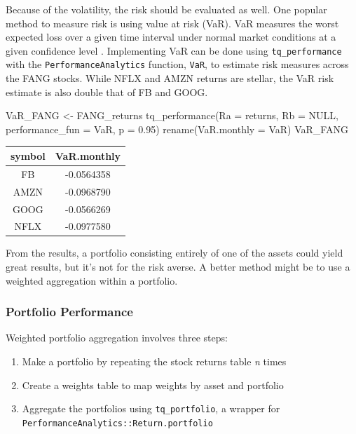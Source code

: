 Because of the volatility, the risk should be evaluated as well. One
popular method to measure risk is using value at risk (VaR). VaR
measures the worst expected loss over a given time interval under normal
market conditions at a given confidence level \citep{Bacon2004}.
Implementing VaR can be done using \texttt{tq\_performance} with the
\texttt{PerformanceAnalytics} function, \texttt{VaR}, to estimate risk
measures across the FANG stocks. While NFLX and AMZN returns are
stellar, the VaR risk estimate is also double that of FB and GOOG.

\begin{Schunk}
\begin{Sinput}
VaR_FANG <- FANG_returns %
    tq_performance(Ra = returns, Rb = NULL, performance_fun = VaR, p = 0.95) %
    rename(VaR.monthly = VaR) 
VaR_FANG
\end{Sinput}
\end{Schunk}

\begin{tabular}{cc}
\toprule
symbol & VaR.monthly\\
\midrule
FB & -0.0564358\\
AMZN & -0.0968790\\
GOOG & -0.0566269\\
NFLX & -0.0977580\\
\bottomrule
\end{tabular}

\hspace{20 mm}

From the results, a portfolio consisting entirely of one of the assets
could yield great results, but it's not for the risk averse. A better
method might be to use a weighted aggregation within a portfolio.

\subsubsection{Portfolio Performance}\label{portfolio-performance}

Weighted portfolio aggregation involves three steps:

\begin{enumerate}
\def\labelenumi{\arabic{enumi}.}
\tightlist
\item
  Make a portfolio by repeating the stock returns table \emph{n} times
\item
  Create a weights table to map weights by asset and portfolio
\item
  Aggregate the portfolios using \texttt{tq\_portfolio}, a wrapper for
  \texttt{PerformanceAnalytics::Return.portfolio}
\end{enumerate}

